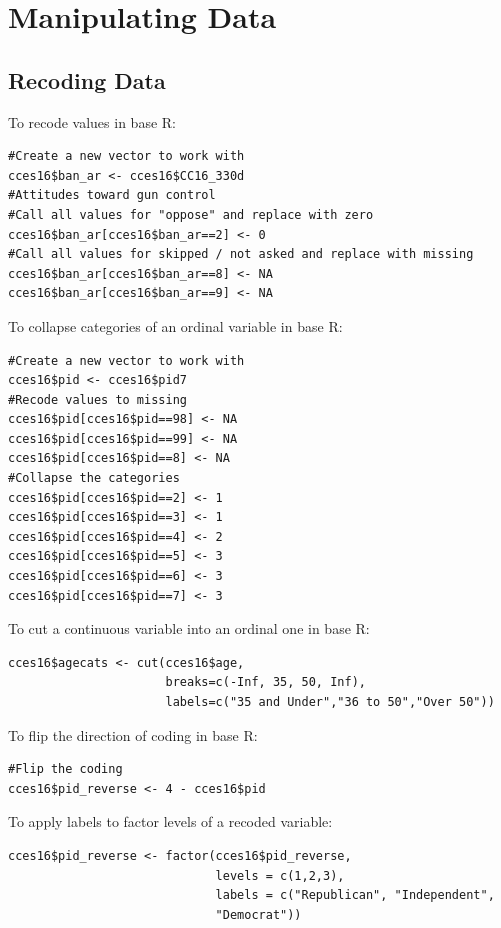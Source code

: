 \documentclass[12pt, letterpaper,notitlepage]{article}
\begin{document}
\newpage
\section{Manipulating Data}
\subsection{Recoding Data}
To recode values in base R:

\begin{lstlisting}
#Create a new vector to work with
cces16$ban_ar <- cces16$CC16_330d
#Attitudes toward gun control
#Call all values for "oppose" and replace with zero
cces16$ban_ar[cces16$ban_ar==2] <- 0
#Call all values for skipped / not asked and replace with missing
cces16$ban_ar[cces16$ban_ar==8] <- NA
cces16$ban_ar[cces16$ban_ar==9] <- NA
\end{lstlisting}

To collapse categories of an ordinal variable in base R:
\begin{lstlisting}
#Create a new vector to work with
cces16$pid <- cces16$pid7
#Recode values to missing
cces16$pid[cces16$pid==98] <- NA
cces16$pid[cces16$pid==99] <- NA
cces16$pid[cces16$pid==8] <- NA
#Collapse the categories
cces16$pid[cces16$pid==2] <- 1
cces16$pid[cces16$pid==3] <- 1
cces16$pid[cces16$pid==4] <- 2
cces16$pid[cces16$pid==5] <- 3
cces16$pid[cces16$pid==6] <- 3
cces16$pid[cces16$pid==7] <- 3
\end{lstlisting}

To cut a continuous variable into an ordinal one in base R:
\begin{lstlisting}
cces16$agecats <- cut(cces16$age,
                      breaks=c(-Inf, 35, 50, Inf),
                      labels=c("35 and Under","36 to 50","Over 50"))
\end{lstlisting}

To flip the direction of coding in base R:
\begin{lstlisting}
#Flip the coding
cces16$pid_reverse <- 4 - cces16$pid
\end{lstlisting}

To apply labels to factor levels of a recoded variable:
\begin{lstlisting}
cces16$pid_reverse <- factor(cces16$pid_reverse,
                             levels = c(1,2,3),
                             labels = c("Republican", "Independent",
                             "Democrat"))
\end{lstlisting}


\newpage
\end{document}
